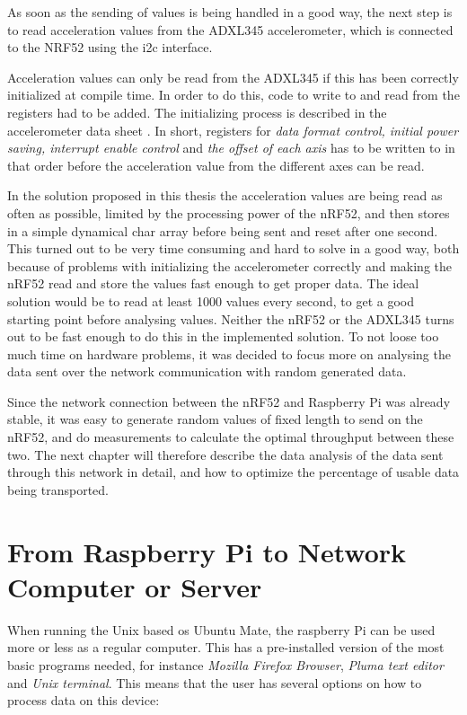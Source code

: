As soon as the sending of values is being handled in a good way, the next step is to read acceleration values from the ADXL345 accelerometer, which is connected to the NRF52 using the \gls{i2c} interface. 

Acceleration values can only be read from the ADXL345 if this has been correctly initialized at compile time. In order to do this, code to write to and read from the registers had to be added. The initializing process is described in the accelerometer data sheet \cite{adxlDataSheet}. In short, registers for \textit{data format control, initial power saving, interrupt enable control} and \textit{the offset of each axis} has to be written to in that order before the acceleration value from the different axes can be read.  

In the solution proposed in this thesis the acceleration values are being read as often as possible, limited by the processing power of the nRF52, and then stores in a simple dynamical char array before being sent and reset after one second. This turned out to be very time consuming and hard to solve in a good way, both because of problems with initializing the accelerometer correctly and making the nRF52 read and store the values fast enough to get proper data. The ideal solution would be to read at least 1000 values every second, to get a good starting point before analysing values. Neither the nRF52 or the ADXL345 turns out to be fast enough to do this in the implemented solution.  To not loose too much time on hardware problems, it was decided to focus more on analysing the data sent over the network communication with random generated data. 

Since the network connection between the nRF52 and Raspberry Pi was already stable, it was easy to generate random values of fixed length to send on the nRF52, and do measurements to calculate the optimal throughput between these two. The next chapter will therefore describe the data analysis of the data sent through this network in detail, and how to optimize the percentage of usable data being transported.  



\section{From Raspberry Pi to Network Computer or Server}

When running the Unix based \gls{os} Ubuntu Mate, the raspberry Pi can be used more or less as a regular computer. This has a pre-installed version of the most basic programs needed, for instance \textit{Mozilla Firefox Browser}, \textit{Pluma text editor} and \textit{Unix terminal}. This means that the user has several options on how to process data on this device: 

